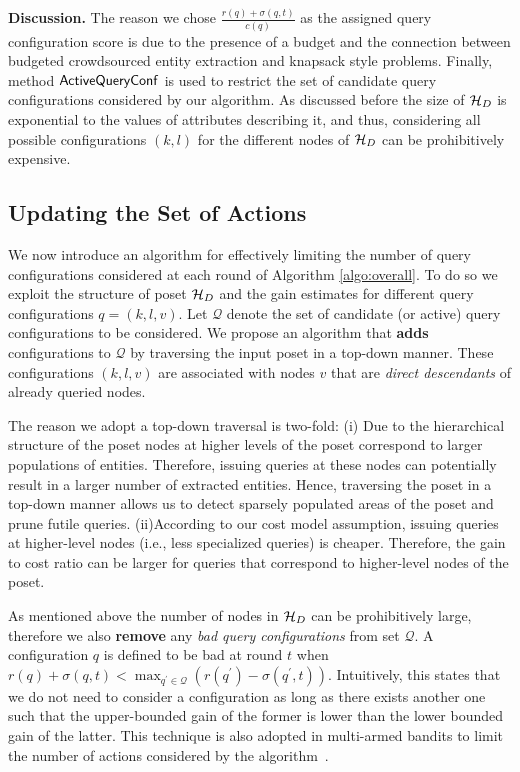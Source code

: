 \vspace{2pt}\noindent\textbf{Discussion.} The reason we chose $\frac{r(q) + \sigma(q,t)}{c(q)}$ as the assigned query configuration score is due to the presence of a budget and the connection between budgeted crowdsourced entity extraction and knapsack style problems. Finally, method ${\sf ActiveQueryConf}$ is used to restrict the set of candidate query configurations considered by our algorithm. As discussed before the size of $\mathcal{H}_D$ is exponential to the values of attributes describing it, and thus, considering all possible configurations $(k,l)$ for the different nodes of $\mathcal{H}_D$ can be prohibitively expensive. 

\subsection{Updating the Set of Actions}
\label{sec:badactions}
We now introduce an algorithm for effectively limiting the number of query configurations considered at each round of Algorithm \ref{algo:overall}. To do so we exploit the structure of poset $\mathcal{H}_D$ and the gain estimates for different query configurations $q = (k,l,v)$. Let $\mathcal{Q}$ denote the set of candidate (or active) query configurations to be considered. We propose an algorithm that {\bf adds} configurations to $\mathcal{Q}$ by traversing the input poset in a top-down manner. These configurations $(k,l,v)$ are associated with nodes $v$ that are {\em direct descendants} of already queried nodes. 

The reason we adopt a top-down traversal is two-fold: (i) Due to the hierarchical structure of the poset nodes at higher levels of the poset correspond to larger populations of entities. Therefore, issuing queries at these nodes can potentially result in a larger number of extracted entities. Hence, traversing the poset in a top-down manner allows us to detect sparsely populated areas of the poset and prune futile queries. (ii)According to our cost model assumption, issuing queries at higher-level nodes (i.e., less specialized queries) is cheaper. Therefore, the gain to cost ratio can be larger for queries that correspond to higher-level nodes of the poset.

As mentioned above the number of nodes in $\mathcal{H}_D$ can be prohibitively large, therefore we also {\bf remove} any {\em bad query configurations} from set $\mathcal{Q}$. A configuration $q$ is defined to be bad at round $t$ when $r(q) + \sigma(q,t) < \max_{q^{\prime} \in \mathcal{Q}} (r(q^{\prime}) - \sigma(q^{\prime},t))$. Intuitively, this states that we do not need to consider a configuration as long as there exists another one such that the upper-bounded gain of the former is lower than the lower bounded gain of the latter. This technique is also adopted in multi-armed bandits to limit the number of actions considered by the algorithm~\cite{EvenDar06actionelimination}. 

